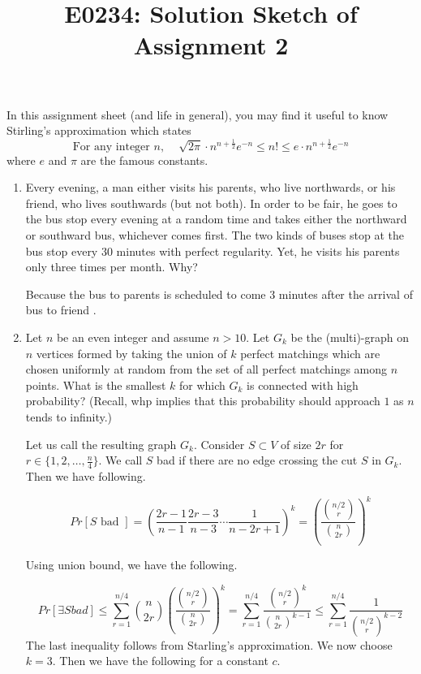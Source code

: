 \documentclass[11pt]{article}
\begin{document}
\title{E0234: Solution Sketch of Assignment 2}
\author{}
\maketitle
In this assignment sheet (and life in general), you may find it useful to know Stirling's approximation which states
\[
	\text{For any integer $n$,}~~~~~~ \sqrt{2\pi}\cdot  n^{n+\frac{1}{2}} e^{-n} \leq n! \leq e\cdot n^{n+\frac{1}{2}} e^{-n} 
\]
where $e$ and $\pi$ are the famous constants.
\begin{enumerate}
\item Every evening, a man either visits his parents, who live northwards, or his friend, who lives southwards (but not both). In order to be fair, he goes to the bus stop every evening at a random time and takes either the northward or southward bus, whichever comes first. The two kinds of buses stop at the bus stop every 30 minutes with perfect regularity. Yet, he visits his parents only three times per month. Why?

\Sol Because the bus to parents is scheduled to come $3$ minutes after the arrival of bus to friend \smiley{}.

	
			\item Let $n$ be an even integer and assume $n > 10$. Let $G_k$ be the (multi)-graph on $n$ vertices formed by taking the union of $k$ perfect matchings which are chosen uniformly at random 
	          from the set of all perfect matchings among $n$ points. What is the smallest $k$ for which $G_k$ is connected with high probability? (Recall, whp implies that this probability should approach $1$
	          as $n$ tends to infinity.) 
	          
	          \Sol Let us call the resulting graph $G_k$. Consider $S\subset V$ of size $2r$ for $r\in\{1, 2, \ldots, \frac{n}{4}\}$. We call $S$ bad if there are no edge crossing the cut $S$ in $G_k$. Then we have following.
              
              \[ Pr[S \text{ bad }] = \left(\frac{2r-1}{n-1}\frac{2r-3}{n-3}\cdots\frac{1}{n-2r+1}\right)^k = \left(\frac{{n/2\choose r}}{{n\choose 2r}}\right)^k \]
              
              Using union bound, we have the following.
              
              \[ Pr[\exists S bad] \le \sum_{r=1}^{n/4} {n\choose 2r}\left(\frac{{n/2\choose r}}{{n\choose 2r}}\right)^k = \sum_{r=1}^{n/4}\frac{{n/2\choose r}^k}{{n\choose 2r}^{k-1}} \le \sum_{r=1}^{n/4}\frac{1}{{n/2 \choose r}^{k-2}} \]
              The last inequality follows from Starling's approximation. We now choose $k=3$. Then we have the following for a constant $c$.
              

\end{enumerate}
\end{document}
